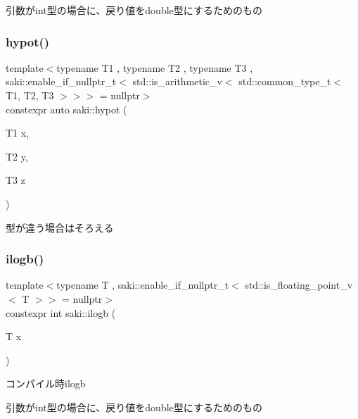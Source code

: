 引数がint型の場合に、戻り値をdouble型にするためのもの 

\mbox{\label{namespacesaki_a210e4f63ae8c3ff62e53396f8ba45d91}} 
\subsubsection{\texorpdfstring{hypot()}{hypot()}\hspace{0.1cm}{\footnotesize\ttfamily [6/6]}}
{\footnotesize\ttfamily template$<$typename T1 , typename T2 , typename T3 , saki\+::enable\+\_\+if\+\_\+nullptr\+\_\+t$<$ std\+::is\+\_\+arithmetic\+\_\+v$<$ std\+::common\+\_\+type\+\_\+t$<$ T1, T2, T3 $>$$>$$>$  = nullptr$>$ \\
constexpr auto saki\+::hypot (\begin{DoxyParamCaption}\item[{T1}]{x,  }\item[{T2}]{y,  }\item[{T3}]{z }\end{DoxyParamCaption})}



型が違う場合はそろえる 

\mbox{\label{namespacesaki_a582e9de82aa8572287c01530ae2626a8}} 
\subsubsection{\texorpdfstring{ilogb()}{ilogb()}}
{\footnotesize\ttfamily template$<$typename T , saki\+::enable\+\_\+if\+\_\+nullptr\+\_\+t$<$ std\+::is\+\_\+floating\+\_\+point\+\_\+v$<$ T $>$$>$  = nullptr$>$ \\
constexpr int saki\+::ilogb (\begin{DoxyParamCaption}\item[{T}]{x }\end{DoxyParamCaption})}



コンパイル時ilogb 

引数がint型の場合に、戻り値をdouble型にするためのもの \mbox{\label{namespacesaki_a52a09941a80893dfdea6da4c220fba08}} 
